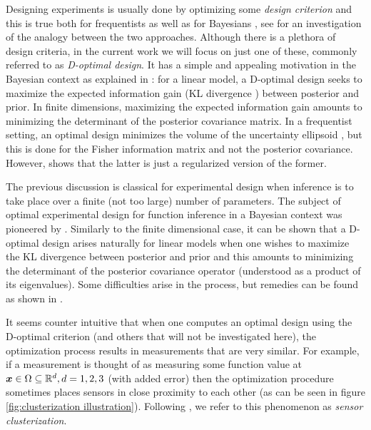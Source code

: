 \documentclass{amsart}
\numberwithin{equation}{section}
\begin{document}
Designing experiments is usually done by optimizing some \emph{design
  criterion} and this is true both for frequentists
\cite{Silvey13,Ucinski05} as well as for Bayesians
\cite{ChalonerVerdinelli95}, see \cite{ChalonerVerdinelli95} for an
investigation of the analogy between the two approaches. Although
there is a plethora of design criteria, in the current work we will
focus on just one of these, commonly referred to as \emph{D-optimal
  design}. It has a simple and appealing motivation in the Bayesian
context as explained in \cite{ChalonerVerdinelli95}: for a linear
model, a D-optimal design seeks to maximize the expected information
gain (KL divergence \cite{KullbackLeibler51,CoverThomas12}) between
posterior and prior. In finite dimensions, maximizing the expected
information gain amounts to minimizing the determinant of the
posterior covariance matrix. In a frequentist setting, an optimal
design minimizes the volume of the uncertainty ellipsoid \cite[page
  16]{Ucinski05}, but this is done for the Fisher information matrix
and not the posterior covariance. However, \cite{ChalonerVerdinelli95}
shows that the latter is just a regularized version of the former.

The previous discussion is classical for experimental design when
inference is to take place over a finite (not too large) number of
parameters. The subject of optimal experimental design for function
inference in a Bayesian context was pioneered by
\cite{AlexanderianGloorGhattas14,AlexanderianPetraStadlerEtAl16,
  AlexanderianPetraStadlerEtAl14}. Similarly to the finite dimensional
case, it can be shown that a D-optimal design arises naturally for
linear models when one wishes to maximize the KL divergence between
posterior and prior and this amounts to minimizing the determinant of
the posterior covariance operator (understood as a product of its
eigenvalues). Some difficulties arise in the process, but remedies can
be found as shown in \cite{AlexanderianGloorGhattas14}.

It seems counter intuitive that when one computes an optimal design
using the D-optimal criterion (and others that will not be
investigated here), the optimization process results in measurements
that are very similar. For example, if a measurement is thought of as
measuring some function value at ${\boldsymbol{x}} \in \Omega \subseteq \mathbb{R}^d,
d=1,2,3$ (with added error) then the optimization procedure sometimes
places sensors in close proximity to each other (as can be seen
in figure \ref{fig:clusterization illustration}). Following
\cite{Ucinski05}, we refer to this phenomenon as \emph{sensor
  clusterization}.
\end{document}
